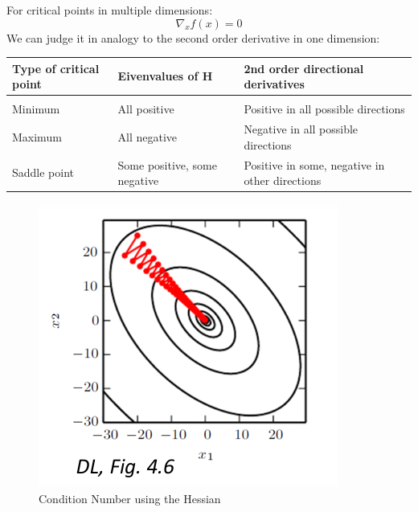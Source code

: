 \documentclass[../Main.tex]{subfiles}
\begin{document}
For critical points in multiple dimensions:
\begin{equation*}
    \nabla_x f(x) = 0
\end{equation*}
We can judge it in analogy to the second order derivative in one dimension:
\begin{table}[H]
    \begin{tabular}{l|l|l}
     Type of critical point & Eivenvalues of H & 2nd order directional derivatives  \\
     \hline \\
     Minimum & All positive & Positive in all possible directions  \\
     Maximum & All negative & Negative in all possible directions  \\
     Saddle point & Some positive, some negative & Positive in some, negative in other directions
    \end{tabular}
\end{table}



\begin{figure}[H]
    \centering
    \includegraphics[width=0.5\linewidth]{Images/hessian-conditioning.png}
    \caption{Condition Number using the Hessian}
    \label{fig:hessian-condition-number}
\end{figure}
\end{document}
